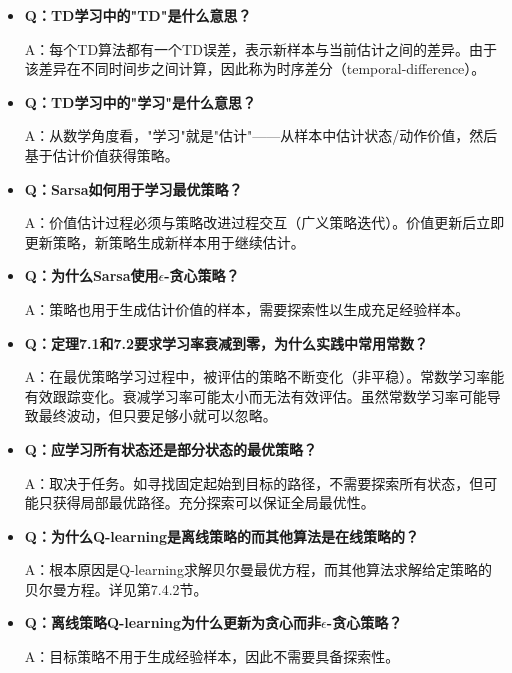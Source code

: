 \documentclass[UTF8]{article}
\begin{document}
\begin{itemize}
    \item \textbf{Q：TD学习中的"TD"是什么意思？}

    A：每个TD算法都有一个TD误差，表示新样本与当前估计之间的差异。由于该差异在不同时间步之间计算，因此称为时序差分（temporal-difference）。

    \item \textbf{Q：TD学习中的"学习"是什么意思？}
    
    A：从数学角度看，"学习"就是"估计"——从样本中估计状态/动作价值，然后基于估计价值获得策略。

    \item \textbf{Q：Sarsa如何用于学习最优策略？}
    
    A：价值估计过程必须与策略改进过程交互（广义策略迭代）。价值更新后立即更新策略，新策略生成新样本用于继续估计。

    \item \textbf{Q：为什么Sarsa使用$\epsilon$-贪心策略？}
    
    A：策略也用于生成估计价值的样本，需要探索性以生成充足经验样本。

    \item \textbf{Q：定理7.1和7.2要求学习率衰减到零，为什么实践中常用常数？}
    
    A：在最优策略学习过程中，被评估的策略不断变化（非平稳）。常数学习率能有效跟踪变化。衰减学习率可能太小而无法有效评估。虽然常数学习率可能导致最终波动，但只要足够小就可以忽略。

    \item \textbf{Q：应学习所有状态还是部分状态的最优策略？}
    
    A：取决于任务。如寻找固定起始到目标的路径，不需要探索所有状态，但可能只获得局部最优路径。充分探索可以保证全局最优性。

    \item \textbf{Q：为什么Q-learning是离线策略的而其他算法是在线策略的？}
    
    A：根本原因是Q-learning求解贝尔曼最优方程，而其他算法求解给定策略的贝尔曼方程。详见第7.4.2节。

    \item \textbf{Q：离线策略Q-learning为什么更新为贪心而非$\epsilon$-贪心策略？}
    
    A：目标策略不用于生成经验样本，因此不需要具备探索性。
\end{itemize}
\end{document}
